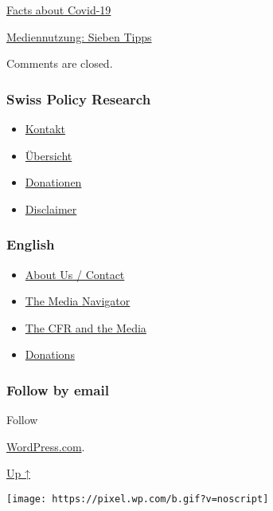 \href{https://swprs.org/2018/10/01/covid-19-hinweis-ii/}{Facts about
Covid-19}

\href{https://swprs.org/2020/07/21/mediennutzung-sieben-tipps/}{Mediennutzung:
Sieben Tipps}

Comments are closed.

\hypertarget{swiss-policy-research}{%
\subsubsection{Swiss Policy Research}\label{swiss-policy-research}}

\begin{itemize}
\tightlist
\item
  \href{https://swprs.org/kontakt/}{Kontakt}
\item
  \href{https://swprs.org/uebersicht/}{Übersicht}
\item
  \href{https://swprs.org/donationen/}{Donationen}
\item
  \href{https://swprs.org/disclaimer/}{Disclaimer}
\end{itemize}

\hypertarget{english}{%
\subsubsection{English}\label{english}}

\begin{itemize}
\tightlist
\item
  \href{https://swprs.org/contact/}{About Us / Contact}
\item
  \href{https://swprs.org/media-navigator/}{The Media Navigator}
\item
  \href{https://swprs.org/the-american-empire-and-its-media/}{The CFR
  and the Media}
\item
  \href{https://swprs.org/donations/}{Donations}
\end{itemize}

\hypertarget{follow-by-email}{%
\subsubsection{Follow by email}\label{follow-by-email}}

Follow

\href{https://wordpress.com/?ref=footer_custom_com}{WordPress.com}.

\protect\hyperlink{}{Up ↑}

\texttt{[image: https://pixel.wp.com/b.gif?v=noscript]}
